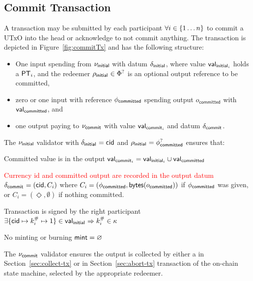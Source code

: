 \subsection{Commit Transaction}\label{sec:commit-tx}

A \mtxCom{} transaction may be submitted by each participant
$\forall i \in \{1 \dots n\}$ to commit a UTxO into the head or acknowledge
to not commit anything. The transaction is depicted in Figure~\ref{fig:commitTx}
and has the following structure:
\begin{itemize}
	\item One input spending from $\nu_{\mathsf{initial}}$ with datum $\delta_{\mathsf{initial}_{}}$,
	      where value $\mathsf{val}_{\mathsf{initial}_{i}}$ holds a $\mathsf{PT}_i$, and the redeemer
	      $\rho_{\mathsf{initial}_{}} \in \Phi^{?}$ is an optional output
	      reference to be committed,
	\item zero or one input with reference $\phi_{\mathsf{committed}}$
	      spending output $o_{\mathsf{committed}}$ with
	      $\mathsf{val}_{\mathsf{committed}}$, and
	\item one output paying to $\nu_{\mathsf{commit}}$ with value $\mathsf{val}_{\mathsf{commit}_{i}}$ and datum $\delta_{\mathsf{commit}_{}}$.
\end{itemize}

\noindent The $\nu_{\mathsf{initial}}$ validator with $\delta_{\mathsf{initial}_{}} = \mathsf{cid}$ and
$\rho_{\mathsf{initial}_{}} = \phi_{\mathsf{committed}}^{?}$ ensures that:
\begin{menumerate}
	\item Committed value is in the output
	$\mathsf{val}_{\mathsf{commit}_{i}} = \mathsf{val}_{\mathsf{initial}_{i}} \cup \mathsf{val}_{\mathsf{committed}}$
	\item \textcolor{red}{Currency id and committed output are recorded in the
		output datum} $\delta_{\mathsf{commit}_{}} = (\mathsf{cid}, C_{i})$ where
	$C_{i} = (\phi_{\mathsf{committed}},\mathsf{bytes}(o_{\mathsf{committed}}))$ if
	$\phi_{\mathsf{committed}}$ was given, or $C_{i} = (\Diamond, \emptyset)$
	if nothing committed.
	\item Transaction is signed by the right participant
	$\exists \{\mathsf{cid} \mapsto k^{\#}_{i} \mapsto 1\} \in \mathsf{val}_{\mathsf{initial}_{}} \Rightarrow k^{\#}_{i} \in \kappa$
	\item No minting or burning $\mathsf{mint} = \varnothing$
\end{menumerate}

\noindent The $\nu_{\mathsf{commit}}$ validator ensures the output is collected by either a
\mtxCCom{} in Section~\ref{sec:collect-tx} or \mtxAbort{} in
Section~\ref{sec:abort-tx} transaction of the on-chain state machine, selected
by the appropriate redeemer.

